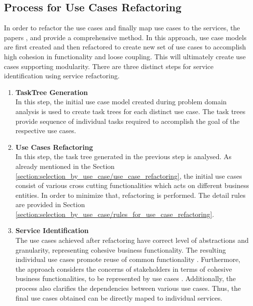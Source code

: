\subsection{Process for Use Cases Refactoring}\label{section:selection_by_use_case/process_for_use_case_refactoring}
In order to refactor the use cases and finally map use cases to the services, the papers \cite{Kim:2006aa}, \cite{Yun:2006aa} and \cite{Doh:2007aa} provide a comprehensive method. In this approach, use case models are first created and then refactored to create new set of use cases to accomplish high cohesion in functionality and loose coupling. This will ultimately create use cases supporting modularity. \cite{Fareghzadeh:2008aa} There are three distinct steps for service identification using service refactoring.
\begin{enumerate}
\item \textbf{TaskTree Generation}\\
In this step, the initial use case model created during problem domain analysis is used to create task trees for each distinct use case. The task trees provide sequence of individual tasks required to accomplish the goal of the respective use cases.
\\
\item \textbf{Use Cases Refactoring}\\
In this step, the task tree generated in the previous step is analysed. As already mentioned in the Section \ref{section:selection_by_use_case/use_case_refactoring}, the initial use cases consist of various cross cutting functionalities which acts on different business entities. In order to minimize that, refactoring is performed. The detail rules are provided in Section \ref{section:selection_by_use_case/rules_for_use_case_refactoring}.
\\
\item \textbf{Service Identification}\\
The use cases achieved after refactoring have correct level of abstractions and granularity, representing cohesive business functionality. The resulting individual use cases promote reuse of common functionality \cite{Doh:2007aa}. Furthermore, the approach considers the concerns of stakeholders in terms of cohesive business functionalities, to be represented by use cases \cite{Fareghzadeh:2008aa}. Additionally, the process also clarifies the dependencies between various use cases. Thus, the final use cases obtained can be directly maped to individual services.
\end{enumerate}
\\
